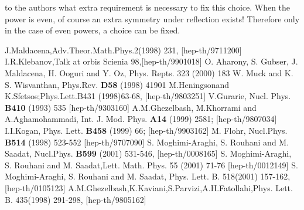 \documentclass[a4paper,12pt]{article}
\begin{document}
to the authors what extra requirement is necessary to fix this
choice. When the power is even, of course an extra symmetry under
reflection   \coordHE{} exists!
Therefore only in the case of even powers, a choice can be fixed.
\begin{thebibliography}{99}
  J.Maldacena,Adv.Theor.Math.Phys.2(1998) 231,  [hep-th/9711200]
 I.R.Klebanov,Talk at orbis Scienia
98,[hep-th/9901018]
  O. Aharony, S. Gubser, J. Maldacena, H. Ooguri and Y. Oz,
Phys. Repts. 323 (2000) 183
 W. Muck and K. S. Wisvanthan, Phys.Rev. \textbf{D58} (1998) 41901
 M.Heningsonand K.Sfetsos;Phys.Lett.B431
(1998)63-68, [hep-th/9803251]
  V.Gurarie, Nucl. Phys.
\textbf{B410} (1993) 535 [hep-th/9303160]
 A.M.Ghezelbash, M.Khorrami and A.Aghamohammadi,
 Int. J. Mod. Phys. \textbf{A14} (1999) 2581;  [hep-th/9807034]
  I.I.Kogan,
 Phys. Lett. \textbf{B458} (1999) 66;  [hep-th/9903162]
  M. Flohr, Nucl.Phys. \textbf{B514} (1998) 523-552 [hep-th/9707090]
 S. Moghimi-Araghi, S. Rouhani and M. Saadat, Nucl.Phys.
\textbf{B599} (2001) 531-546, [hep-th/0008165]
  S. Moghimi-Araghi, S. Rouhani and M.
Saadat,Lett. Math. Phys. 55 (2001) 71-76 [hep-th/0012149]
  S. Moghimi-Araghi, S. Rouhani and M. Saadat,
Phys. Lett. B. 518(2001) 157-162, [hep-th/0105123]
  A.M.Ghezelbash,K.Kaviani,S.Parvizi,A.H.Fatollahi,Phys. Lett. B. 435(1998) 291-298,
 [hep-th/9805162]

\end{thebibliography}
\end{document}
